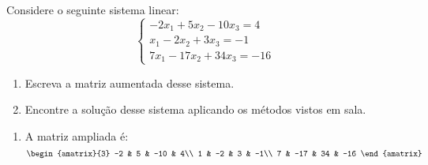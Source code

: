 \documentclass[12pt]{exam}
\begin{document}
    \questao{} Considere o seguinte sistema linear:
    \[
    \begin{cases}
        -2x_1 + 5x_2 - 10x_3 = 4\\
        x_1 - 2x_2 + 3x_3 = -1\\
        7x_1 - 17x_2 + 34x_3 = -16
    \end{cases}
    \]
    \begin{enumerate}[label={\alph*})]
        \item Escreva a matriz aumentada desse sistema.

        \item Encontre a solução desse sistema aplicando os métodos vistos em sala.
    \end{enumerate}
    \solucao
    \begin{enumerate}[label={\alph*})]
        \item A matriz ampliada é:
        \[
            \begin{amatrix}{3}
                -2 & 5 & -10 & 4\\
                1 & -2 & 3 & -1\\
                7 & -17 & 34 & -16
            \end{amatrix}
        \]


\end{enumerate}
\end{document}

